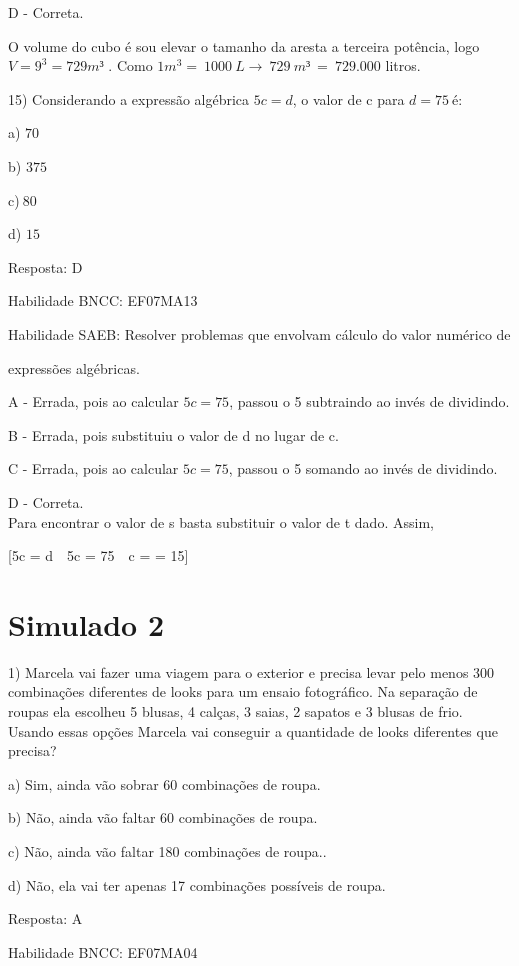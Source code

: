 D - Correta.

O volume do cubo é sou elevar o tamanho da aresta a terceira potência,
logo \(V = 9^{3} = 729m³\) . Como
\(1m^{3} = \ 1000\ L \rightarrow \ 729\ m³\  = \ 729.000\) litros.

15) Considerando a expressão algébrica \(5c = d\), o valor de c para
\(d = 75\ \)é:

a) \(70\)

b) \(375\)

c)\(\ 80\)

d) \(15\)

Resposta: D

Habilidade BNCC: EF07MA13

Habilidade SAEB: Resolver problemas que envolvam cálculo do valor
numérico de

expressões algébricas.

A - Errada, pois ao calcular \(5c = 75\), passou o 5 subtraindo ao invés
de dividindo.

B - Errada, pois substituiu o valor de d no lugar de c.

C - Errada, pois ao calcular \(5c = 75\), passou o 5 somando ao invés de
dividindo.

D - Correta.\\
Para encontrar o valor de s basta substituir o valor de t dado. Assim,

[5c = d\  \rightarrow \ 5c = 75\  \rightarrow \ c =  = 15]

\section{Simulado 2}

1) Marcela vai fazer uma viagem para o exterior e precisa levar pelo
menos 300 combinações diferentes de looks para um ensaio fotográfico. Na
separação de roupas ela escolheu 5 blusas, 4 calças, 3 saias, 2 sapatos
e 3 blusas de frio. Usando essas opções Marcela vai conseguir a
quantidade de looks diferentes que precisa?

a) Sim, ainda vão sobrar 60 combinações de roupa.

b) Não, ainda vão faltar 60 combinações de roupa.

c) Não, ainda vão faltar 180 combinações de roupa..

d) Não, ela vai ter apenas 17 combinações possíveis de roupa.

Resposta: A

Habilidade BNCC: EF07MA04

